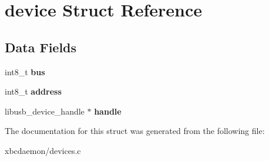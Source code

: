 \section{device Struct Reference}
\label{structdevice}
\subsection*{Data Fields}
\begin{DoxyCompactItemize}
\item 
int8\-\_\-t {\bfseries bus}\label{structdevice_abb32649ab67e086f7c548e3e8b4b66f9}

\item 
int8\-\_\-t {\bfseries address}\label{structdevice_a97b18776f162b8776de42e4eea5bfbfb}

\item 
libusb\-\_\-device\-\_\-handle $\ast$ {\bfseries handle}\label{structdevice_a96cd449c4b349daaf3ec8700056aa462}

\end{DoxyCompactItemize}


The documentation for this struct was generated from the following file\-:\begin{DoxyCompactItemize}
\item 
xbcdaemon/devices.\-c\end{DoxyCompactItemize}
